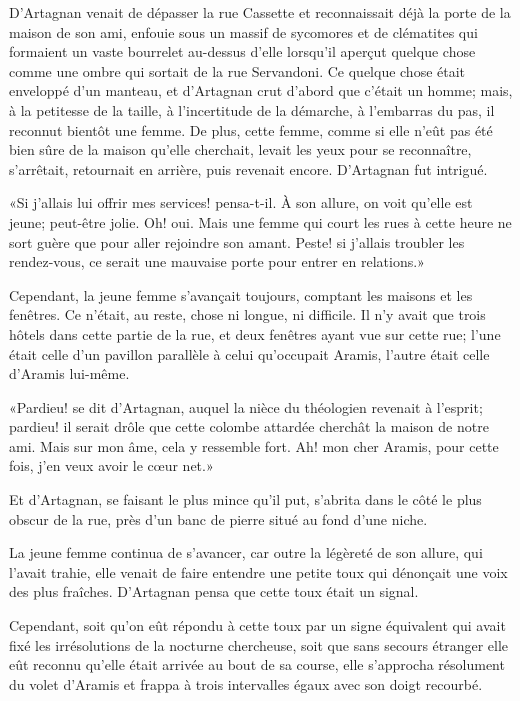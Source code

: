 D'Artagnan venait de dépasser la rue Cassette et reconnaissait déjà la porte de la maison de son ami, enfouie sous un massif de sycomores et de clématites qui formaient un vaste bourrelet au-dessus d'elle lorsqu'il aperçut quelque chose comme une ombre qui sortait de la rue Servandoni. Ce quelque chose était enveloppé d'un manteau, et d'Artagnan crut d'abord que c'était un homme; mais, à la petitesse de la taille, à l'incertitude de la démarche, à l'embarras du pas, il reconnut bientôt une femme. De plus, cette femme, comme si elle n'eût pas été bien sûre de la maison qu'elle cherchait, levait les yeux pour se reconnaître, s'arrêtait, retournait en arrière, puis revenait encore. D'Artagnan fut intrigué. 

«Si j'allais lui offrir mes services! pensa-t-il. À son allure, on voit qu'elle est jeune; peut-être jolie. Oh! oui. Mais une femme qui court les rues à cette heure ne sort guère que pour aller rejoindre son amant. Peste! si j'allais troubler les rendez-vous, ce serait une mauvaise porte pour entrer en relations.» 

Cependant, la jeune femme s'avançait toujours, comptant les maisons et les fenêtres. Ce n'était, au reste, chose ni longue, ni difficile. Il n'y avait que trois hôtels dans cette partie de la rue, et deux fenêtres ayant vue sur cette rue; l'une était celle d'un pavillon parallèle à celui qu'occupait Aramis, l'autre était celle d'Aramis lui-même. 

«Pardieu! se dit d'Artagnan, auquel la nièce du théologien revenait à l'esprit; pardieu! il serait drôle que cette colombe attardée cherchât la maison de notre ami. Mais sur mon âme, cela y ressemble fort. Ah! mon cher Aramis, pour cette fois, j'en veux avoir le cœur net.» 

Et d'Artagnan, se faisant le plus mince qu'il put, s'abrita dans le côté le plus obscur de la rue, près d'un banc de pierre situé au fond d'une niche. 

La jeune femme continua de s'avancer, car outre la légèreté de son allure, qui l'avait trahie, elle venait de faire entendre une petite toux qui dénonçait une voix des plus fraîches. D'Artagnan pensa que cette toux était un signal. 

Cependant, soit qu'on eût répondu à cette toux par un signe équivalent qui avait fixé les irrésolutions de la nocturne chercheuse, soit que sans secours étranger elle eût reconnu qu'elle était arrivée au bout de sa course, elle s'approcha résolument du volet d'Aramis et frappa à trois intervalles égaux avec son doigt recourbé. 


